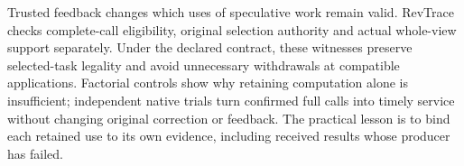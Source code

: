 Trusted feedback changes which uses of speculative work remain valid.
RevTrace checks complete-call eligibility, original selection authority
and actual whole-view support separately. Under the declared contract,
these witnesses preserve selected-task legality and avoid unnecessary
withdrawals at compatible applications. Factorial controls show why
retaining computation alone is insufficient; independent native trials
turn confirmed full calls into timely service without changing original
correction or feedback. The practical lesson is to bind each retained use
to its own evidence, including received results whose producer has failed.
